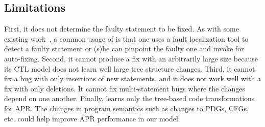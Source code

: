 \subsection{Limitations}
\label{sec:limitations}


First, it does not determine the faulty statement to be fixed. As with
some existing work~\cite{cure-icse21,lutellier2020coconut}, a common
usage of {\tool} is that one uses a fault localization tool to detect
a faulty statement or (s)he can pinpoint the faulty one and invoke
{\tool} for auto-fixing. Second, it cannot produce a fix with an
arbitrarily large size because its CTL model does not learn well large
tree structure changes. Third, it cannot fix a bug with only
insertions of new statements, and it does not work well with a fix
with only deletions.
It cannot fix multi-statement bugs where the changes depend on one
another. Finally, {\tool} learns only the tree-based code
transformations for APR. The changes in program semantics such as
changes to PDGs, CFGs, etc. could help improve APR performance in our
model.

